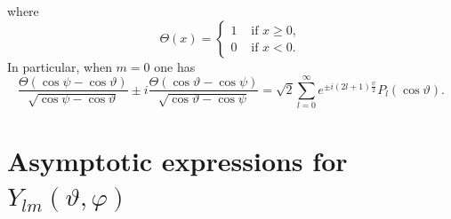 where
\begin{equation}
\Theta(x)= \begin{cases}1 & \text { if } x \geq 0,  \label{eq:5:11:6}\\ 0 & \text { if } x<0 .\end{cases}
\end{equation}
In particular, when $m=0$ one has
\begin{equation}
\frac{\Theta(\cos \psi-\cos \vartheta)}{\sqrt{\cos \psi-\cos \vartheta}} \pm i \frac{\Theta(\cos \vartheta-\cos \psi)}{\sqrt{\cos \vartheta-\cos \psi}}=\sqrt{2} \sum_{l=0}^{\infty} e^{ \pm i(2 l+1) \frac{\psi}{2}} P_{l}(\cos \vartheta) . \label{eq:5:11:7}
\end{equation}
\section{Asymptotic expressions for $Y_{l m}(\vartheta, \varphi)$}\label{sec:5.12}
